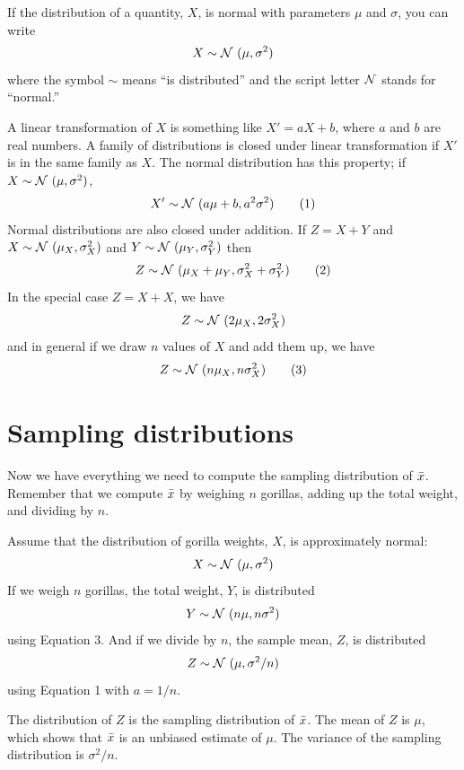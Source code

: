 \documentclass[12pt]{book}
\begin{document}
If the distribution of a quantity, $X$, is
normal with parameters $\mu$ and $\sigma$, you can write
%
\[ X \sim \mathcal{N}~(\mu, \sigma^{2})\]
%
where the symbol $\sim$ means ``is distributed'' and the script letter
$\mathcal{N}$ stands for ``normal.''


A linear transformation of $X$ is something like $X' = a X + b$, where
$a$ and $b$ are real numbers.
A family of distributions is closed under
linear transformation if $X'$ is in the same family as $X$.  The normal
distribution has this property; if $X \sim \mathcal{N}~(\mu,
\sigma^2)$,
%
\[ X' \sim \mathcal{N}~(a \mu + b, a^{2} \sigma^2) \tag*{(1)} \]
%
Normal distributions are also closed under addition.  
If $Z = X + Y$ and
$X \sim \mathcal{N}~(\mu_{X}, \sigma_{X}^{2})$ and
$Y \sim \mathcal{N}~(\mu_{Y}, \sigma_{Y}^{2})$ then
%
\[ Z \sim \mathcal{N}~(\mu_X + \mu_Y, \sigma_X^2 + \sigma_Y^2)  \tag*{(2)}\]
%
In the special case $Z = X + X$, we have
%
\[ Z \sim \mathcal{N}~(2 \mu_X, 2 \sigma_X^2) \]
%
and in general if we draw $n$ values of $X$ and add them up, we have
%
\[ Z \sim \mathcal{N}~(n \mu_X, n \sigma_X^2)  \tag*{(3)}\]


\section{Sampling distributions}

Now we have everything we need to compute the sampling distribution of
$\bar{x}$.  Remember that we compute $\bar{x}$ by weighing $n$ gorillas,
adding up the total weight, and dividing by $n$.

Assume that the distribution of gorilla weights, $X$, is
approximately normal:
%
\[ X \sim \mathcal{N}~(\mu, \sigma^2)\]
%
If we weigh $n$ gorillas, the total weight, $Y$, is distributed
%
\[ Y \sim \mathcal{N}~(n \mu, n \sigma^2) \]
%
using Equation 3.  And if we divide by $n$, the sample mean,
$Z$, is distributed
%
\[ Z \sim \mathcal{N}~(\mu, \sigma^2/n) \]
%
using Equation 1 with $a = 1/n$.

The distribution of $Z$ is the sampling distribution of $\bar{x}$.
The mean of $Z$ is $\mu$, which shows that $\bar{x}$ is an unbiased
estimate of $\mu$.  The variance of the sampling distribution
is $\sigma^2 / n$.
\end{document}
